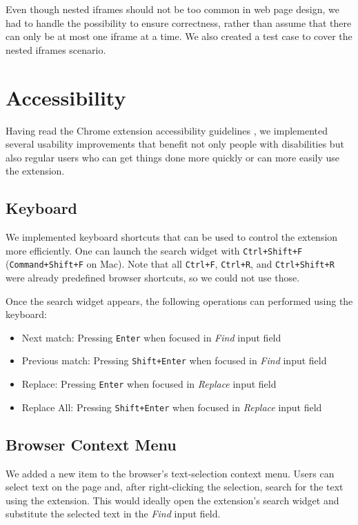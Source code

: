 \documentclass[bsc,frontabs,twoside,singlespacing,parskip,deptreport]{infthesis}
\providecommand{\tightlist}{%
  \setlength{\itemsep}{0pt}\setlength{\parskip}{0pt}}
\begin{document}
Even though nested iframes should not be too common in web page design, we had to handle the possibility to ensure correctness, rather than assume that there can only be at most one iframe at a time. We also created a test case to cover the nested iframes scenario.

\section{Accessibility}
Having read the Chrome extension accessibility guidelines \cite{C4}, we implemented several usability improvements that benefit not only people with disabilities but also regular users who can get things done more quickly or can more easily use the extension. 

\subsection{Keyboard}
We implemented keyboard shortcuts that can be used to control the extension more efficiently. One can launch the search widget with \texttt{Ctrl+Shift+F} (\texttt{Command+Shift+F} on
Mac). Note that all \texttt{Ctrl+F}, \texttt{Ctrl+R}, and
\texttt{Ctrl+Shift+R} were already predefined browser shortcuts, so we could not use those.

Once the search widget appears, the following operations can performed using the keyboard:
\begin{itemize}
\tightlist
\item
  Next match: Pressing \texttt{Enter} when focused in \emph{Find} input field
\item
  Previous match: Pressing \texttt{Shift+Enter} when focused in \emph{Find} input field
\item
  Replace: Pressing \texttt{Enter} when focused in \emph{Replace} input field
\item
  Replace All: Pressing \texttt{Shift+Enter} when focused in \emph{Replace} input field
\end{itemize}

\subsection{Browser Context Menu}
We added a new item to the browser's text-selection context menu. Users can select text on the page and, after right-clicking the selection, search for the text using the extension. This would ideally open the extension's search widget and substitute the selected text in the \textit{Find} input field. 
\end{document}
